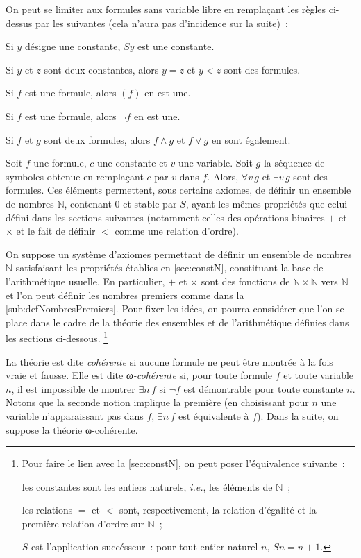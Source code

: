 On peut se limiter aux formules sans variable libre en remplaçant les règles ci-dessus par les suivantes (cela n'aura pas d'incidence sur la suite) :
\startitemize[nowhite]
  \item Si $y$ désigne une constante, $S y$ est une constante.
  \item Si $y$ et $z$ sont deux constantes, alors $y = z$ et $y < z$ sont des formules.
  \item Si $f$ est une formule, alors $(f)$ en est une. 
  \item Si $f$ est une formule, alors $\lnot f$ en est une. 
  \item Si $f$ et $g$ sont deux formules, alors $f \wedge g$ et $f \vee g$ en sont également. 
  \item Soit $f$ une formule, $c$ une constante et $v$ une variable. 
      Soit $g$ la séquence de symboles obtenue en remplaçant $c$ par $v$ dans $f$.
      Alors, $\forall v \, g$ et $\exists v \, g$ sont des formules.
\stopitemize
Ces éléments permettent, sous certains axiomes, de définir un ensemble de nombres $\mathbb{N}$, contenant $0$ et stable par $S$, ayant les mêmes propriétés que celui défini dans les sections suivantes (notamment celles des opérations binaires $+$ et $\times$ et le fait de définir $<$ comme une relation d'ordre). 

On suppose un système d'axiomes permettant de définir un ensemble de nombres $\mathbb{N}$ satisfaisant les propriétés établies en [sec:constN], constituant la base de l'arithmétique usuelle.
En particulier, $+$ et $\times$ sont des fonctions de $\mathbb{N} \times \mathbb{N}$ vers $\mathbb{N}$ et l'on peut définir les nombres premiers comme dans la [sub:defNombresPremiers]. 
Pour fixer les idées, on pourra considérer que l'on se place dans le cadre de la théorie des ensembles et de l'arithmétique définies dans les sections ci-dessous.%
\footnote{
  Pour faire le lien avec la [sec:constN], on peut poser l'équivalence suivante :
  \startitemize[nowhite]
    \item les constantes sont les entiers naturels, \emph{i.e.}, les éléments de $\mathbb{N}$ ;
    \item les relations $=$ et $<$ sont, respectivement, la relation d'égalité et la première relation d'ordre sur $\mathbb{N}$ ;
    \item $S$ est l'application succésseur : pour tout entier naturel $n$, $S n = n + 1$.
  \stopitemize
} 

La théorie est dite \emph{cohérente} si aucune formule ne peut être montrée à la fois vraie et fausse. 
Elle est dite \emph{ω-cohérente} si, pour toute formule $f$ et toute variable $n$, il est impossible de montrer $\exists n \, f$ si $\lnot f$ est démontrable pour toute constante $n$. 
Notons que la seconde notion implique la première (en choisissant pour $n$ une variable n'apparaissant pas dans $f$, $\exists n \, f$ est équivalente à $f$).
Dans la suite, on suppose la théorie ω-cohérente.

